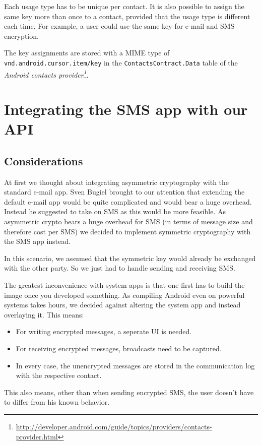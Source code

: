 \documentclass[a4paper,draft]{scrartcl}
\begin{document}
		Each usage type has to be unique per contact. It is also possible to assign the same key more than once to a contact, provided that the usage type is different each time. For example, a user could use the same key for e-mail and SMS encryption.

		The key assignments are stored with a MIME type of \texttt{vnd.android.cursor.item/key} in the \texttt{ContactsContract.Data} table of the {\em Android contacts provider\footnote{\url{http://developer.android.com/guide/topics/providers/contacts-provider.html}}}.
		
\section{Integrating the SMS app with our API}
	\label{sec-sms-app}
	
	\subsection{Considerations}
		At first we thought about integrating asymmetric cryptography with the standard e-mail app. Sven Bugiel brought to our attention that extending the default e-mail app would be quite complicated and would bear a huge overhead. Instead he suggested to take on SMS as this would be more feasible. As asymmetric crypto bears a huge overhead for SMS (in terms of message size and therefore cost per SMS) we decided to implement symmetric cryptography with the SMS app instead. %
	
		In this scenario, we assumed that the symmetric key would already be exchanged with the other party. So we just had to handle sending and receiving SMS.
	
		The greatest inconvenience with system apps is that one first has to build the image once you developed something. As compiling Android even on powerful systems takes hours, we decided against altering the system app and instead overlaying it. This means:
		\begin{itemize}
			\item For writing encrypted messages, a seperate UI is needed.
			\item For receiving encrypted messages, broadcasts need to be captured.
			\item In every case, the unencrypted messages are stored in the communication log with the respective contact.
		\end{itemize}
		This also means, other than when sending encrypted SMS, the user doesn't have to differ from his known behavior.
		
\end{document}
